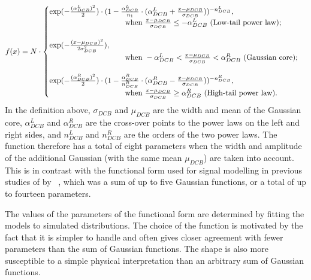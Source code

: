 \begin{equation}
\label{eq:DCB_form}
f(x)= N \cdot \begin{cases} 
\exp(-\frac{(\alpha_{DCB}^{L})^2}{2}) \cdot (1-\frac{\alpha_{DCB}^{L}}{n_1}\cdot (\alpha_{DCB}^{L} +\frac{x-\mu_{DCB}}{\sigma_{DCB}}))^{-n_{DCB}^{L}}, \\
\hspace{3.5cm} \text{when } \frac{x-\mu_{DCB}}{\sigma_{DCB}} \leq -\alpha_{DCB}^{L} \text{ (Low-tail power law)}; \\ 
\\
\exp (-\frac{(x-\mu_{DCB})^{2}}{2\sigma_{DCB}^2}), \\
 \hspace{3.5cm} \text{when } -\alpha_{DCB}^{L} < \frac{x-\mu_{DCB}}{\sigma_{DCB}} < \alpha_{DCB}^{R} \text{ (Gaussian core)}; \\ 
 \\
\exp(-\frac{(\alpha_{DCB}^{R})^2}{2}) \cdot (1-\frac{\alpha_{DCB}^{R}}{n_{DCB}^{R}}\cdot (\alpha_{DCB}^{R} - \frac{x-\mu_{DCB}}{\sigma_{DCB}}))^{-n_{DCB}^{R}},\\
 \hspace{3.5cm} \text{when } \frac{x-\mu_{DCB}}{\sigma_{DCB}} \geq \alpha_{DCB}^{R} \text{ (High-tail power law)}. \\
\end{cases}
\end{equation}
In the definition above, $\sigma_{DCB}$ and $\mu_{DCB}$ are the width and mean of the Gaussian core, $\alpha_{DCB}^{L}$ and $\alpha_{DCB}^{R}$ are the cross-over points to the power laws on the left and right sides, and $n_{DCB}^{L}$ and $n_{DCB}^{R}$ are the orders of the two power laws. The \DCBpG function therefore has a total of eight parameters when the width and amplitude of the additional Gaussian (with the same mean $\mu_{DCB}$) are taken into account. This is in contrast with the functional form used for signal modelling in previous studies of \Hgg by \CMS~\cite{LegacyHgg,CMS-PAS-HIG-15-005,CMS-PAS-HIG-16-020}, which was a sum of up to five Gaussian functions, or a total of up to fourteen parameters.

The values of the parameters of the functional form are determined by fitting the models to simulated \mgg distributions. 
The choice of the \DCBpG function is motivated by the fact that it is simpler to handle and often gives closer agreement with fewer parameters than the sum of Gaussian functions. 
The \DCB shape is also more susceptible to a simple physical interpretation than an arbitrary sum of Gaussian functions. 

